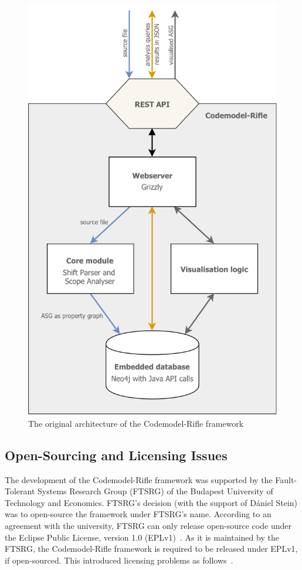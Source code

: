 \begin{figure}[!p]
	\centering
	\includegraphics[height=\textheight-18mm,clip]{figures/codemodel-rifle-original-architecture.pdf}
	\caption{The original architecture of the Codemodel-Rifle framework}
	\label{fig:codemodel-rifle-original-architecture}
\end{figure}


\subsection{Open-Sourcing and Licensing Issues}

The development of the Codemodel-Rifle framework was supported by the Fault-Tolerant Systems Research Group (FTSRG) of the Budapest University of Technology and Economics. FTSRG's decision (with the support of Dániel Stein) was to open-source the framework under FTSRG's name. According to an agreement with the university, FTSRG can only release open-source code under the Eclipse Public License, version 1.0 (EPLv1)~\cite{eplv1}. As it is maintained by the FTSRG, the Codemodel-Rifle framework is required to be released under EPLv1, if open-sourced. This introduced licensing problems as follows~\cite{codemodel-rifle-licensing}.

